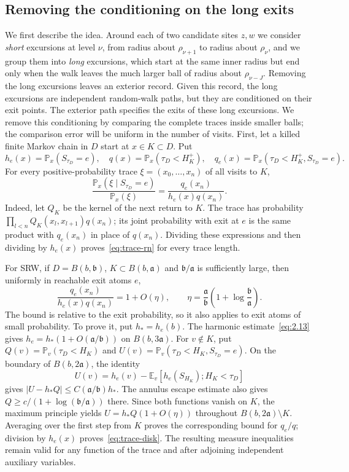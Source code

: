 \documentclass[11pt,letterpaper,reqno]{amsart}
\newif\ifrevmarks \revmarkstrue
\newif\ifshowdeleted \showdeletedfalse
\newcommand{\add}[1]{\ifrevmarks\textcolor{revorange}{#1}\else#1\fi}
\newcommand{\del}[1]{\ifrevmarks\ifshowdeleted{\color{revorange}\footnotesize[\textit{deleted:}~#1]}%
  \else\mbox{\textsuperscript{\textcolor{revorange}{\normalfont\bfseries[del]}}}\fi\fi}
\numberwithin{equation}{section}
\theoremstyle{remark}
\begin{document}
\subsection{Removing the conditioning on the long exits}\label{sec:exterior}\label{sec:exitkernel}
\add{We first describe the idea. Around each of two candidate sites $z,w$ we consider \emph{short} excursions at level $\nu$, from radius about $\rho_{\nu+1}$ to radius about $\rho_\nu$, and we group them into \emph{long} excursions, which start at the same inner radius but end only when the walk leaves the much larger ball of radius about $\rho_{\nu-J}$. Removing the long excursions leaves an exterior record. Given this record, the long excursions are independent random-walk paths, but they are conditioned on their exit points.} The exterior path specifies the exits of \del{certain}\add{these} long excursions. We remove this conditioning by comparing the complete traces inside smaller balls; the comparison error will be uniform in the number of visits. First, let a killed finite Markov chain in $D$ start at $x\in K\subset D$. Put
\[
 h_e(x)=\mathbb P_x(S_{\tau_D}=e),\quad
 q(x)=\mathbb P_x(\tau_D<H_K^+),\quad
 q_e(x)=\mathbb P_x(\tau_D<H_K^+,S_{\tau_D}=e).
\]
For every positive-probability trace $\xi=(x_0,\ldots,x_n)$ of all visits to $K$,
\begin{equation}\label{eq:trace-rn}
 \frac{\mathbb P_x(\xi\mid S_{\tau_D}=e)}{\mathbb P_x(\xi)}
 =\frac{q_e(x_n)}{h_e(x)q(x_n)}.
\end{equation}
Indeed, let $Q_K$ be the kernel of the next return to $K$. The trace has probability $\prod_{l<n}Q_K(x_l,x_{l+1})q(x_n)$; its joint probability with exit at $e$ is the same product with $q_e(x_n)$ in place of $q(x_n)$. Dividing these expressions and then dividing by $h_e(x)$ proves~\eqref{eq:trace-rn} for every trace length.

For SRW, if $D=B(b,\mathfrak b)$, $K\subset B(b,\mathfrak a)$ and $\mathfrak b/\mathfrak a$ is sufficiently large, then uniformly in reachable exit atoms $e$,
\begin{equation}\label{eq:trace-disk}
 \frac{q_e(x_n)}{h_e(x)q(x_n)}=1+O(\eta),\qquad
 \eta=\frac{\mathfrak a}{\mathfrak b}\left(1+\log\frac{\mathfrak b}{\mathfrak a}\right).
\end{equation}
The bound is relative to the exit probability, so it also applies to exit atoms of small probability. To prove it, put $h_*=h_e(b)$. The harmonic estimate~\eqref{eq:2.13} gives $h_e=h_*(1+O(\mathfrak a/\mathfrak b))$ on $B(b,3\mathfrak a)$. For $v\notin K$, put $Q(v)=\mathbb P_v(\tau_D<H_K)$ and $U(v)=\mathbb P_v(\tau_D<H_K,S_{\tau_D}=e)$. On the boundary of $B(b,2\mathfrak a)$, the identity
\[
 U(v)=h_e(v)-\mathbb E_v[h_e(S_{H_K});H_K<\tau_D]
\]
gives $|U-h_*Q|\le C(\mathfrak a/\mathfrak b)h_*$. The annulus escape estimate also gives $Q\ge c/(1+\log(\mathfrak b/\mathfrak a))$ there. Since both functions vanish on $K$, the maximum principle yields $U=h_*Q(1+O(\eta))$ throughout $B(b,2\mathfrak a)\setminus K$. Averaging over the first step from $K$ proves the corresponding bound for $q_e/q$; division by $h_e(x)$ proves~\eqref{eq:trace-disk}. The resulting measure inequalities remain valid for any function of the trace and after adjoining independent auxiliary variables.
\end{document}
